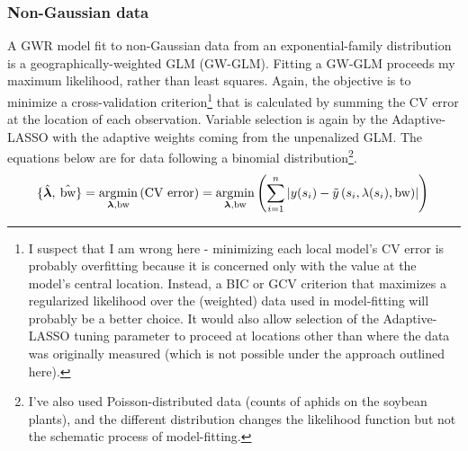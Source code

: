\documentclass[10pt]{amsart}
\DeclareMathOperator*{\argmin}{\arg\!\min}
\DeclareMathOperator*{\bw}{\mbox{bw}}
\newcommand{\vect}[1]{\boldsymbol{#1}}
\begin{document}
		\subsubsection{Non-Gaussian data} A GWR model fit to non-Gaussian data from an exponential-family distribution is a geographically-weighted GLM (GW-GLM). Fitting a GW-GLM proceeds my maximum likelihood, rather than least squares. Again, the objective is to minimize a cross-validation criterion\footnote{I suspect that I am wrong here - minimizing each local model's CV error is probably overfitting because it is concerned only with the value at the model's central location. Instead, a BIC or GCV criterion that maximizes a regularized likelihood over the (weighted) data used in model-fitting will probably be a better choice. It would also allow selection of the Adaptive-LASSO tuning parameter to proceed at locations other than where the data was originally measured (which is not possible under the approach outlined here).} that is calculated by summing the CV error at the location of each observation. Variable selection is again by the Adaptive-LASSO with the adaptive weights coming from the unpenalized GLM. The equations below are for data following a binomial distribution\footnote{I've also used Poisson-distributed data (counts of aphids on the soybean plants), and the different distribution changes the likelihood function but not the schematic process of model-fitting.}.\\
		\[
			\{ \hat{\vect{\lambda}}, \: \hat{\bw} \} = \argmin_{\vect{\lambda}, \text{bw}} \left( \mbox{CV error} \right)  = \argmin_{\vect{\lambda}, \text{bw}} \left( \sum_{i = 1}^n \left| y(s_i)-\tilde{y} \left(s_i, \lambda(s_i), \bw \right) \right| \right)\\
		\]	
		
\end{document}
